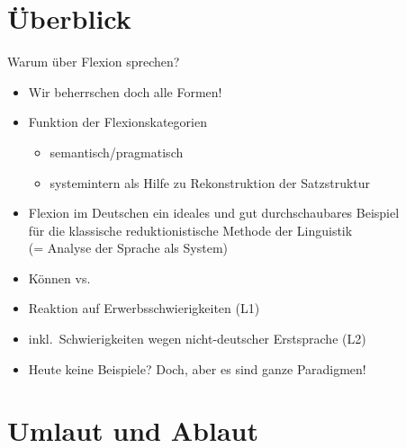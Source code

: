 \section{Überblick}

\begin{frame}
  {Warum über Flexion sprechen?}
  \pause
  \begin{itemize}[<+->]
    \item \alert{Wir beherrschen doch alle Formen!}
      \Halbzeile
    \item Funktion der Flexionskategorien
      \begin{itemize}
        \item semantisch\slash pragmatisch
        \item \alert{systemintern} als Hilfe zu \alert{Rekonstruktion der Satzstruktur}
      \end{itemize}
      \Halbzeile
    \item Flexion im Deutschen ein ideales und gut durchschaubares Beispiel\\
      für die klassische \alert{reduktionistische} Methode der Linguistik\\
      (= Analyse der Sprache als \alert{System})
      \Halbzeile
    \item \alert{Können} vs.\ 
    \item Reaktion auf Erwerbsschwierigkeiten (L1)
    \item inkl.\ Schwierigkeiten wegen nicht-deutscher Erstsprache (L2)
      \Halbzeile
    \item Heute keine Beispiele? Doch, aber es sind ganze Paradigmen!
  \end{itemize}
\end{frame}


\section{Umlaut und Ablaut}

